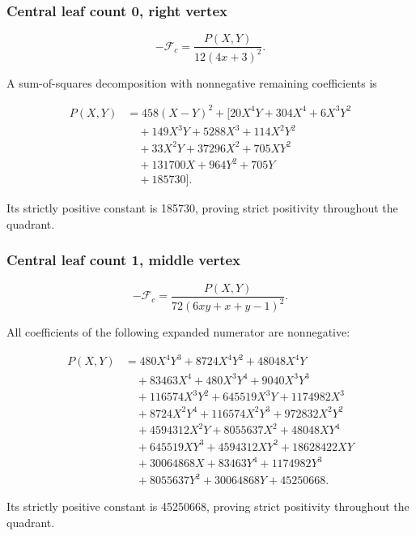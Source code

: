 \documentclass[11pt,letterpaper]{article}
\theoremstyle{plain}
\begin{document}
\par\noindent\begin{minipage}{\linewidth}
\subsubsection*{Central leaf count 0, right vertex}\label{central-leaf-count-0-right-vertex}

\[
-\mathcal F_c=\frac{P(X,Y)}{12 \left(4 x + 3\right)^{2}}.
\]

A sum-of-squares decomposition with nonnegative remaining coefficients is

\[
\begin{aligned}
P(X,Y)&=458 \left(X - Y\right)^{2}+\bigl[20 X^{4} Y + 304 X^{4} + 6 X^{3} Y^{2} \\
&\quad + 149 X^{3} Y + 5288 X^{3} + 114 X^{2} Y^{2} \\
&\quad + 33 X^{2} Y + 37296 X^{2} + 705 X Y^{2} \\
&\quad + 131700 X + 964 Y^{2} + 705 Y \\
&\quad + 185730\bigr].
\end{aligned}
\]

Its strictly positive constant is 185730, proving strict positivity throughout the quadrant.
\end{minipage}\par\medskip

\par\noindent\begin{minipage}{\linewidth}
\subsubsection*{Central leaf count 1, middle vertex}\label{central-leaf-count-1-middle-vertex}

\[
-\mathcal F_c=\frac{P(X,Y)}{72 \left(6 x y + x + y - 1\right)^{2}}.
\]

All coefficients of the following expanded numerator are nonnegative:

\[
\begin{aligned}
P(X,Y)&=480 X^{4} Y^{3} + 8724 X^{4} Y^{2} + 48048 X^{4} Y \\
&\quad + 83463 X^{4} + 480 X^{3} Y^{4} + 9040 X^{3} Y^{3} \\
&\quad + 116574 X^{3} Y^{2} + 645519 X^{3} Y + 1174982 X^{3} \\
&\quad + 8724 X^{2} Y^{4} + 116574 X^{2} Y^{3} + 972832 X^{2} Y^{2} \\
&\quad + 4594312 X^{2} Y + 8055637 X^{2} + 48048 X Y^{4} \\
&\quad + 645519 X Y^{3} + 4594312 X Y^{2} + 18628422 X Y \\
&\quad + 30064868 X + 83463 Y^{4} + 1174982 Y^{3} \\
&\quad + 8055637 Y^{2} + 30064868 Y + 45250668.
\end{aligned}
\]

Its strictly positive constant is 45250668, proving strict positivity throughout the quadrant.
\end{minipage}\par\medskip
\end{document}
